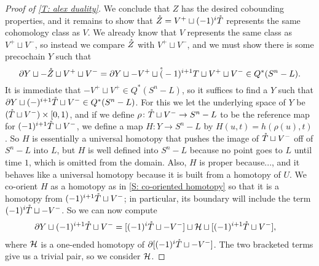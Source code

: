 \begin{example}
\begin{proof}[Proof of \cref{T: alex duality}]
We conclude that $Z$ has the desired cobounding properties, and it remains to show that $\mathring{Z}
= V^+ \sqcup (-1)^i\mathring{T}$ represents the same cohomology class as $V$.
We already know that $V$ represents the same class as $V^+ \sqcup V^-$, so instead we compare $\mathring{Z}$ with $V^+ \sqcup V^-$, and we must show there is some precochain $Y$ such that
$$\partial Y \sqcup -\mathring{Z}\sqcup V^+\sqcup V^- = \partial Y \sqcup -V^+ \sqcup \mathring{(}-1)^{i+1}T \sqcup V^+ \sqcup V^- \in Q^*(S^n-L).$$
It is immediate that $-V^+ \sqcup V^+ \in Q^*(S^n-L)$, so it suffices to find a $Y$ such that
$\partial Y \sqcup (-)^{i+1} \mathring{T} \sqcup V^- \in Q^*(S^n-L)$.
For this we let the underlying space of $Y$ be $(\mathring{T} \sqcup V^-) \times [0,1)$, and if we define $\rho \colon \mathring{T} \sqcup V^- \to S^n -L$ to be the reference map for $(-1)^{i+1}\mathring{T} \sqcup V^-$, we define a map $H \colon Y \to S^n-L$ by $H(u,t) = h(\rho(u),t)$.
So $H$ is essentially a universal homotopy that pushes the image of $\mathring{T} \sqcup V^-$ off of $S^n-L$ into $L$, but $H$ is well defined into $S^n-L$ because no point goes to $L$ until time $1$, which is omitted from the domain.
Also, $H$ is proper because..., and it behaves like a universal homotopy because it is built from a homotopy of $U$.
We co-orient $H$ as a homotopy as in \cref{S: co-oriented homotopy} so that it is a homotopy from $(-1)^{i+1}\mathring{T} \sqcup V^-$; in particular, its boundary will include the term $(-1)^{i}\mathring{T} \sqcup - V^-$.
So we can now compute
\begin{align*}
\partial Y \sqcup (-1)^{i+1} \mathring{T} \sqcup V^-
&= [(-1)^{i}\mathring{T} \sqcup - V^-] \sqcup \mathcal{H} \sqcup [(-1)^{i+1} \mathring{T} \sqcup V^-],
\end{align*}
where $\mathcal{H}$ is a one-ended homotopy of $\partial[ (-1)^i\mathring{T} \sqcup - V^-]$.
The two bracketed terms give us a trivial pair, so we consider
$\mathcal{H}$.


\end{proof}
\end{example}
